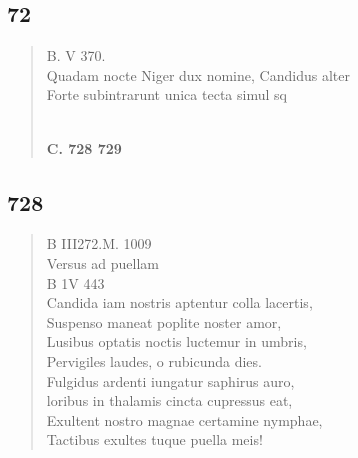 \documentclass[11pt, a4paper]{report}
\begin{document}
            \subsection*{72}
      \begin{verse}
      B. V 370. \\  \lbrack Quadam nocte Niger dux nomine, Candidus alter \\ Forte subintrarunt unica tecta simul sq \rbrack  \\ 
        ﻿\pagebreak 
    \begin{center} \textbf{C. 728 729} \end{center} \marginpar{[215]} 
      \end{verse}
  
            \subsection*{728}
      \begin{verse}
      B III272.M. 1009 \\ Versus ad puellam \\ B 1V 443 \\ Candida iam nostris aptentur colla lacertis, \\ Suspenso maneat poplite noster amor, \\ Lusibus optatis noctis luctemur in umbris, \\ Pervigiles laudes, o rubicunda dies. \\ Fulgidus ardenti iungatur saphirus auro, \\ loribus in thalamis cincta cupressus eat, \\ Exultent nostro magnae certamine nymphae, \\ Tactibus exultes tuque puella meis! \\ 
      \end{verse}
  
\end{document}

